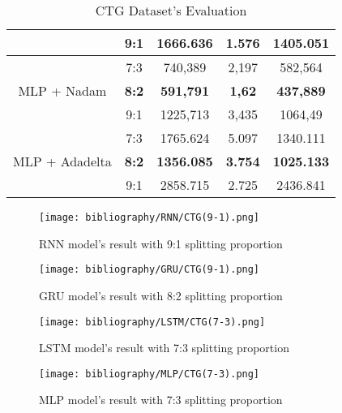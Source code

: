 \documentclass{ieeeojies}
\begin{document}
\begin{table}[H]
\begin{tabular}{|c|c|c|c|c|}
         & 9:1 & 1666.636 & 1.576 & 1405.051\\
         \hline
         \multirow{3}{*}{MLP + Nadam} 
         & 7:3 & 740,389 & 2,197 & 582,564 \\ 
         & \textbf{8:2} & \textbf{591,791} & \textbf{1,62} & \textbf{437,889} \\ 
         & 9:1 & 1225,713 & 3,435 & 1064,49 \\
         \hline
         \multirow{3}{*}{MLP + Adadelta} 
         & 7:3 & 1765.624 &  5.097 &  1340.111 \\ 
         & \textbf{8:2} & \textbf{1356.085} & \textbf{3.754} &  \textbf{1025.133} \\ 
         & 9:1 & 2858.715 & 2.725 & 2436.841\\
         \hline
    \end{tabular}
    \caption{CTG Dataset's Evaluation}
    \label{vcbresult}
\end{table}

\begin{figure}[H]
  \centering
  \begin{minipage}{0.7\linewidth}
    \centering
    \texttt{[image: bibliography/RNN/CTG(9-1).png]}
    \caption{RNN model's result with 9:1 splitting proportion}
    \label{fig8}
  \end{minipage}
\end{figure}

\begin{figure}[H]
  \centering
  \begin{minipage}{0.7\linewidth}
    \centering
    \texttt{[image: bibliography/GRU/CTG(9-1).png]}
    \caption{GRU model's result with 8:2 splitting proportion}
    \label{fig8}
  \end{minipage}
\end{figure}

\begin{figure}[H]
  \centering
  \begin{minipage}{0.7\linewidth}
    \centering
    \texttt{[image: bibliography/LSTM/CTG(7-3).png]}
    \caption{LSTM model's result with 7:3 splitting proportion}
    \label{fig8}
  \end{minipage}
\end{figure}

\begin{figure}[H]
  \centering
  \begin{minipage}{0.7\linewidth}
    \centering
    \texttt{[image: bibliography/MLP/CTG(7-3).png]}
    \caption{MLP model's result with 7:3 splitting proportion}
    \label{fig8}
  \end{minipage}
\end{figure}
\end{document}
